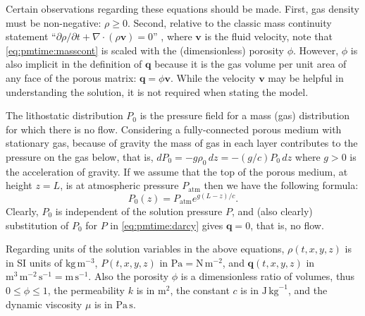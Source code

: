 \documentclass[11pt]{amsart}
\newcommand{\bq}{\mathbf{q}}
\newcommand{\bv}{\mathbf{v}}
\newcommand{\Div}{\nabla\cdot}
\begin{document}
Certain observations regarding these equations should be made.  First, gas density must be non-negative: $\rho\ge 0$.  Second, relative to the classic mass continuity statement ``$\partial\rho/\partial t + \Div(\rho \bv)=0$'' \citep[for example]{Tadmor2012}, where $\bv$ is the fluid velocity, note that \eqref{eq:pmtime:masscont} is scaled with the (dimensionless) porosity $\phi$.  However, $\phi$ is also implicit in the definition of $\bq$ because it is the gas volume per unit area of any face of the porous matrix: $\bq = \phi \bv$.  While the velocity $\bv$ may be helpful in understanding the solution, it is not required when stating the model.

\newcommand{\Patm}{P_{\text{atm}}}
The lithostatic distribution $P_0$ is the pressure field for a mass (gas) distribution for which there is no flow.  Considering a fully-connected porous medium with stationary gas, because of gravity the mass of gas in each layer contributes to the pressure on the gas below, that is, $dP_0 = - g \rho_0\,dz = - (g/c) P_0\,dz$ where $g>0$ is the acceleration of gravity.  If we assume that the top of the porous medium, at height $z=L$, is at atmospheric pressure $\Patm$ then we have the following formula:
\begin{equation}
P_0(z) = \Patm e^{g(L-z)/c}. \label{eq:staticpressure}
\end{equation}
Clearly, $P_0$ is independent of the solution pressure $P$, and (also clearly) substitution of $P_0$ for $P$ in \eqref{eq:pmtime:darcy} gives $\bq=0$, that is, no flow.

Regarding units of the solution variables in the above equations, $\rho(t,x,y,z)$ is in SI units of $\text{kg}\,\text{m}^{-3}$, $P(t,x,y,z)$ in $\text{Pa} = \text{N}\,\text{m}^{-2}$, and $\bq(t,x,y,z)$ in $\text{m}^3\,\text{m}^{-2}\,\text{s}^{-1} = \text{m}\,\text{s}^{-1}$.  Also the porosity $\phi$ is a dimensionless ratio of volumes, thus $0\le \phi \le 1$, the permeability $k$ is in $\text{m}^2$, the constant $c$ is in $\text{J}\,\text{kg}^{-1}$, and the dynamic viscosity $\mu$ is in $\text{Pa}\,\text{s}$.
\end{document}
